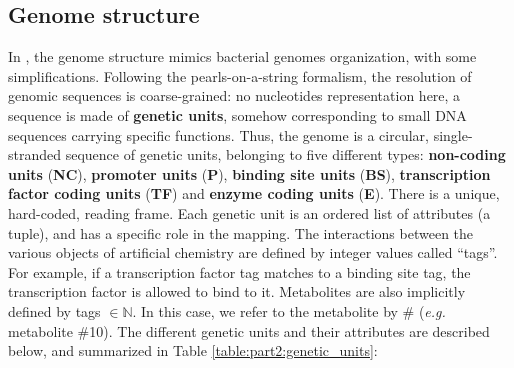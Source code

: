
\subsection{Genome structure}
\label{subsec:part2:methodology:genome_structure}

In {\EvoEvoSim}, the genome structure mimics bacterial genomes organization, with some simplifications. Following the pearls-on-a-string formalism, the resolution of genomic sequences is coarse-grained: no nucleotides representation here, a sequence is made of \textbf{genetic units}, somehow corresponding to small DNA sequences carrying specific functions. Thus, the genome is a circular, single-stranded sequence of genetic units, belonging to five different types: \textbf{non-coding units} (\textbf{NC}), \textbf{promoter units} (\textbf{P}), \textbf{binding site units} (\textbf{BS}), \textbf{transcription factor coding units} (\textbf{TF}) and \textbf{enzyme coding units} (\textbf{E}). There is a unique, hard-coded, reading frame. Each genetic unit is an ordered list of attributes (a tuple), and has a specific role in the mapping. The interactions between the various objects of {\EvoEvoSim} artificial chemistry are defined by integer values called ``tags''. For example, if a transcription factor tag matches to a binding site tag, the transcription factor is allowed to bind to it. Metabolites are also implicitly defined by tags $\in \mathbb{N}$. In this case, we refer to the metabolite by \# (\textit{e.g.} metabolite \#10). The different genetic units and their attributes are described below, and summarized in Table \ref{table:part2:genetic_units}:
